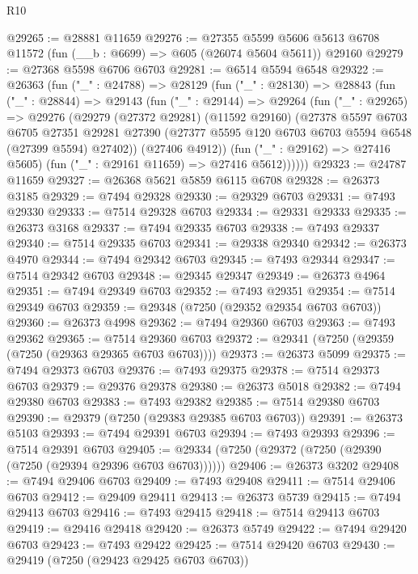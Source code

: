 \begin{lexlean}{R10}
\begin{coremodule}
@29265 := @28881 @11659
@29276 := @27355
    @5599
    @5606
    @5613
    @6708
    @11572
    (fun (__b : @6699) => @605 (@26074 @5604 @5611))
    @29160
@29279 := @27368 @5598 @6706 @6703
@29281 := @6514 @5594 @6548
@29322 := @26363
    (fun ("_" : @24788) =>
    @28129
      (fun ("_" : @28130) =>
      @28843
        (fun ("_" : @28844) =>
        @29143
          (fun ("_" : @29144) =>
          @29264
            (fun ("_" : @29265) =>
            @29276
              (@29279
                (@27372 @29281)
                (@11592 @29160)
                (@27378
                  @5597
                  @6703
                  @6705
                  @27351
                  @29281
                  @27390
                  (@27377 @5595 @120 @6703 @6703 @5594 @6548 (@27399 @5594) @27402))
                (@27406 @4912))
              (fun ("_" : @29162) => @27416 @5605)
              (fun ("_" : @29161 @11659) => @27416 @5612))))))
@29323 := @24787 @11659
@29327 := @26368 @5621 @5859 @6115 @6708
@29328 := @26373 @3185
@29329 := @7494 @29328
@29330 := @29329 @6703
@29331 := @7493 @29330
@29333 := @7514 @29328 @6703
@29334 := @29331 @29333
@29335 := @26373 @3168
@29337 := @7494 @29335 @6703
@29338 := @7493 @29337
@29340 := @7514 @29335 @6703
@29341 := @29338 @29340
@29342 := @26373 @4970
@29344 := @7494 @29342 @6703
@29345 := @7493 @29344
@29347 := @7514 @29342 @6703
@29348 := @29345 @29347
@29349 := @26373 @4964
@29351 := @7494 @29349 @6703
@29352 := @7493 @29351
@29354 := @7514 @29349 @6703
@29359 := @29348 (@7250 (@29352 @29354 @6703 @6703))
@29360 := @26373 @4998
@29362 := @7494 @29360 @6703
@29363 := @7493 @29362
@29365 := @7514 @29360 @6703
@29372 := @29341 (@7250 (@29359 (@7250 (@29363 @29365 @6703 @6703))))
@29373 := @26373 @5099
@29375 := @7494 @29373 @6703
@29376 := @7493 @29375
@29378 := @7514 @29373 @6703
@29379 := @29376 @29378
@29380 := @26373 @5018
@29382 := @7494 @29380 @6703
@29383 := @7493 @29382
@29385 := @7514 @29380 @6703
@29390 := @29379 (@7250 (@29383 @29385 @6703 @6703))
@29391 := @26373 @5103
@29393 := @7494 @29391 @6703
@29394 := @7493 @29393
@29396 := @7514 @29391 @6703
@29405 := @29334 (@7250 (@29372 (@7250 (@29390 (@7250 (@29394 @29396 @6703 @6703))))))
@29406 := @26373 @3202
@29408 := @7494 @29406 @6703
@29409 := @7493 @29408
@29411 := @7514 @29406 @6703
@29412 := @29409 @29411
@29413 := @26373 @5739
@29415 := @7494 @29413 @6703
@29416 := @7493 @29415
@29418 := @7514 @29413 @6703
@29419 := @29416 @29418
@29420 := @26373 @5749
@29422 := @7494 @29420 @6703
@29423 := @7493 @29422
@29425 := @7514 @29420 @6703
@29430 := @29419 (@7250 (@29423 @29425 @6703 @6703))

\end{coremodule}
\end{lexlean}
